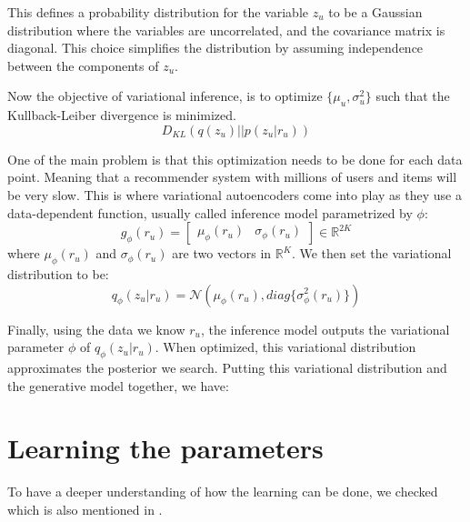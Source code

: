 This defines a probability distribution for the variable $z_u$ to be a Gaussian distribution where the variables are uncorrelated, and the covariance matrix is diagonal. This choice simplifies the distribution by assuming independence between the components of $z_u$.

Now the objective of variational inference, is to optimize $\{ \mu_u, \sigma_u^2 \}$ such that the Kullback-Leiber divergence is minimized.
\[
D_{KL}(q(z_u) || p(z_u | r_u))
\]

One of the main problem is that this optimization needs to be done for each data point. Meaning that a recommender system with millions of users and items will be very slow. This is where variational autoencoders come into play as they use a data-dependent function, usually called inference model parametrized by $\phi$:
\[
g_{\phi}(r_u) = \begin{bmatrix}
    \mu_{\phi}(r_u) & \sigma_{\phi}(r_u)
\end{bmatrix} \in \mathbb{R}^{2K}
\]
where $\mu_{\phi}(r_u)$ and $\sigma_{\phi}(r_u)$ are two vectors in $\mathbb{R}^K$. We then set the variational distribution to be:
\[
q_{\phi}(z_u | r_u) = \mathcal{N} \left(\mu_{\phi}(r_u), diag\{ \sigma_{\phi}^2(r_u) \} \right)
\]

Finally, using the data we know $r_u$, the inference model outputs the variational parameter $\phi$ of $q_{\phi}(z_u | r_u)$. When optimized, this variational distribution approximates the posterior we search. Putting this variational distribution and the generative model together, we have:


\section{Learning the parameters}

To have a deeper understanding of how the learning can be done, we checked \cite{kingma2022autoencoding} which is also mentioned in \cite{liang2018variational}.

